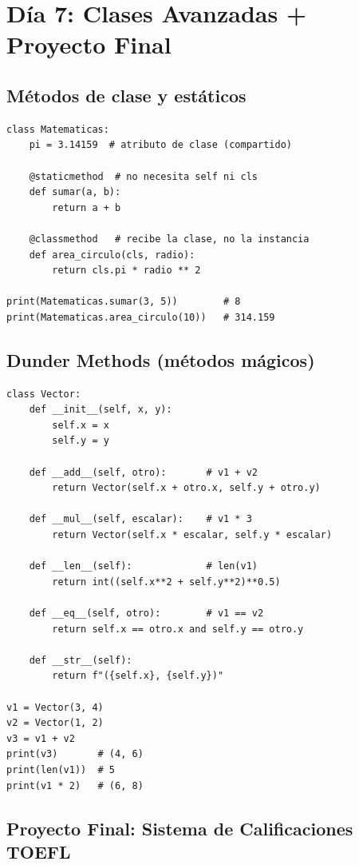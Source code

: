 \documentclass[10pt,a4paper]{article}
\begin{document}
\section*{D\'ia 7: Clases Avanzadas + Proyecto Final}

\subsection*{M\'etodos de clase y est\'aticos}

\begin{lstlisting}
class Matematicas:
    pi = 3.14159  # atributo de clase (compartido)

    @staticmethod  # no necesita self ni cls
    def sumar(a, b):
        return a + b

    @classmethod   # recibe la clase, no la instancia
    def area_circulo(cls, radio):
        return cls.pi * radio ** 2

print(Matematicas.sumar(3, 5))        # 8
print(Matematicas.area_circulo(10))   # 314.159
\end{lstlisting}

\subsection*{Dunder Methods (m\'etodos m\'agicos)}

\begin{lstlisting}
class Vector:
    def __init__(self, x, y):
        self.x = x
        self.y = y

    def __add__(self, otro):       # v1 + v2
        return Vector(self.x + otro.x, self.y + otro.y)

    def __mul__(self, escalar):    # v1 * 3
        return Vector(self.x * escalar, self.y * escalar)

    def __len__(self):             # len(v1)
        return int((self.x**2 + self.y**2)**0.5)

    def __eq__(self, otro):        # v1 == v2
        return self.x == otro.x and self.y == otro.y

    def __str__(self):
        return f"({self.x}, {self.y})"

v1 = Vector(3, 4)
v2 = Vector(1, 2)
v3 = v1 + v2
print(v3)       # (4, 6)
print(len(v1))  # 5
print(v1 * 2)   # (6, 8)
\end{lstlisting}

\subsection*{Proyecto Final: Sistema de Calificaciones TOEFL}
\end{document}
